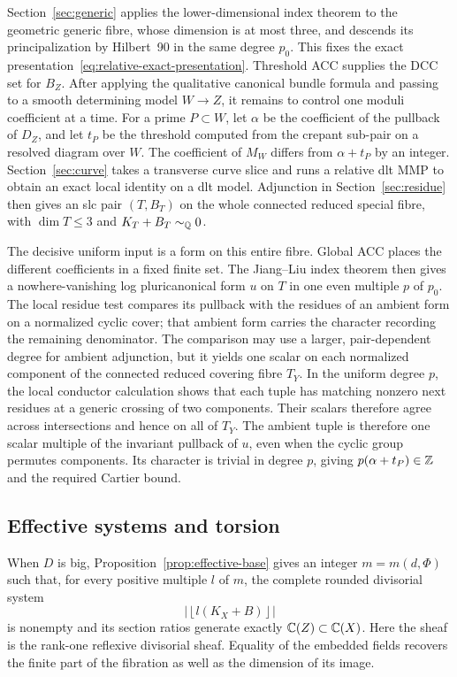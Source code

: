 Section~\ref{sec:generic} applies the lower-dimensional index theorem to
the geometric generic fibre, whose dimension is at most three, and
descends its principalization by Hilbert~90 in the same degree $p_0$.
This fixes the exact presentation~\eqref{eq:relative-exact-presentation}.
Threshold ACC supplies the DCC set for $B_Z$.  After applying the
qualitative canonical bundle formula and passing to a smooth determining
model $W\to Z$, it remains to control one moduli coefficient at a time.
For a prime $P\subset W$, let $\alpha$ be the coefficient of the pullback
of $D_Z$, and let $t_P$ be the threshold computed from the crepant sub-pair
on a resolved diagram over $W$.  The coefficient of $M_W$ differs from
$\alpha+t_P$ by an integer.  Section~\ref{sec:curve} takes a transverse
curve slice and runs a relative dlt MMP to obtain an exact local identity
on a dlt model.
Adjunction in Section~\ref{sec:residue} then gives an slc pair $(T,B_T)$
on the whole connected reduced special fibre, with $\dim T\leq3$ and
$K_T+B_T\sim_\mathbb Q0$.

The decisive uniform input is a form on this entire fibre.  Global ACC
places the different coefficients in a fixed finite set.  The Jiang--Liu
index theorem then gives a nowhere-vanishing log pluricanonical form $u$ on $T$ in one even
multiple $p$ of $p_0$.  The local residue test compares its pullback with
the residues of an ambient form on a normalized cyclic cover; that
ambient form carries the character recording the remaining denominator.
The comparison may use a larger, pair-dependent degree for ambient
adjunction, but it yields one scalar on each normalized component of the
connected reduced covering fibre $T_Y$.  In the uniform degree $p$, the
local conductor calculation shows that each tuple has matching
nonzero next residues at a generic crossing of two components.  Their
scalars therefore agree across intersections and hence on all of $T_Y$.
The ambient tuple is therefore one scalar multiple of the invariant
pullback of $u$, even
when the cyclic group permutes components.  Its character is trivial in
degree $p$, giving $p(\alpha+t_P)\in\mathbb Z$ and the required Cartier bound.

\subsection{Effective systems and torsion}

When $D$ is big, Proposition~\ref{prop:effective-base} gives an integer
$m=m(d,\Phi)$ such that, for every positive multiple $l$ of $m$, the
complete rounded divisorial system
\[
 \left|\left\lfloor l(K_X+B)\right\rfloor\right|
\]
is nonempty and its section ratios generate exactly
$\mathbb C(Z)\subset\mathbb C(X)$.  Here the sheaf is the rank-one reflexive divisorial
sheaf.  Equality of the embedded fields recovers the finite part of the
fibration as well as the dimension of its image.

